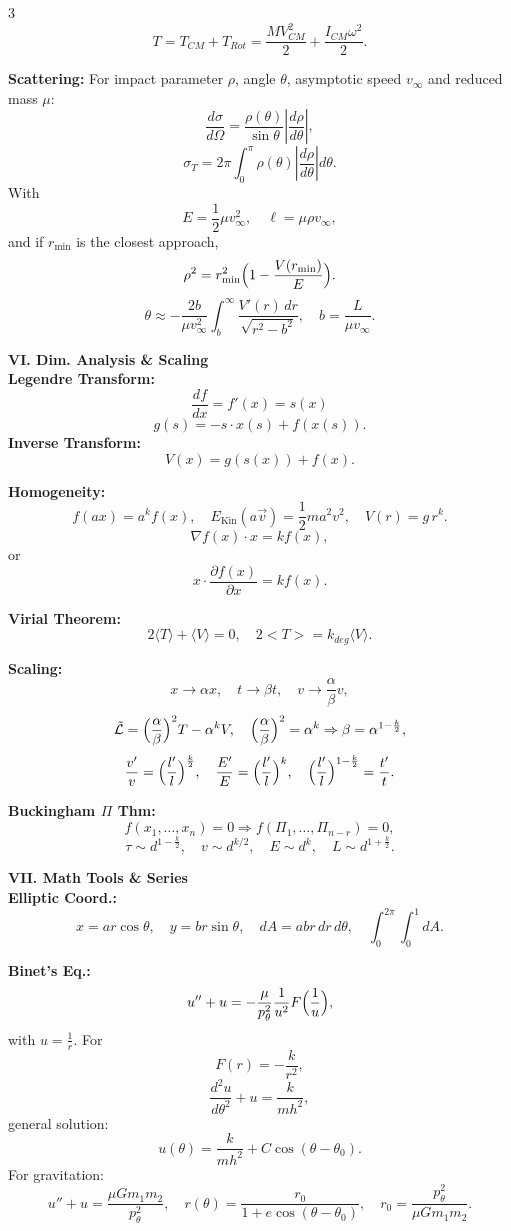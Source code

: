\documentclass[1pt]{article}
\begin{document}
\begin{multicols}{3}
\[
T=T_{CM}+T_{Rot}=\frac{MV_{CM}^2}{2}+\frac{I_{CM}\omega^2}{2}.
\]

\textbf{Scattering:} 
For impact parameter \(\rho\), angle \(\theta\), asymptotic speed \(v_\infty\) and reduced mass \(\mu\):
\[
\frac{d\sigma}{d\Omega}=\frac{\rho(\theta)}{\sin\theta}\left|\frac{d\rho}{d\theta}\right|,
\]
\[
\sigma_T=2\pi\int_0^\pi \rho(\theta)\left|\frac{d\rho}{d\theta}\right|d\theta.
\]
With 
\[
E=\frac{1}{2}\mu v_\infty^2,\quad \ell=\mu\rho v_\infty,
\]
and if \(r_{\min}\) is the closest approach,
\[
\rho^2=r_{\min}^2\Bigl(1-\frac{V(r_{\min})}{E}\Bigr).
\]
\[
\theta\approx -\frac{2b}{\mu v_\infty^2}\int_b^\infty\frac{V'(r)\,dr}{\sqrt{r^2-b^2}},\quad
b=\frac{L}{\mu v_\infty}.
\]

\textbf{VI. Dim. Analysis \& Scaling}\\[2pt]
\textbf{Legendre Transform:} 
\[
\frac{df}{dx}=f'(x)=s(x)
\]
\[
g(s)=-s\cdot x(s)+f(x(s)).
\]
\textbf{Inverse Transform:} 
\[
V(x)=g(s(x))+f(x).
\]

\textbf{Homogeneity:} 
\[
f(ax)=a^kf(x),\quad E_{\text{Kin}}(a\vec{v})=\frac{1}{2}ma^2v^2,
\quad V(r)=g\,r^k.
\]
\[
\nabla f(x)\cdot x=kf(x),
\]
or
\[
x\cdot\frac{\partial f(x)}{\partial x}=kf(x).
\]

\textbf{Virial Theorem:} 
\[
2\langle T\rangle+\langle V\rangle=0,\quad 2<T>=k_{deg}\langle V\rangle.
\]

\textbf{Scaling:} 
\[
x\to\alpha x,\quad t\to\beta t,\quad v\to\frac{\alpha}{\beta}v,
\]
\[
\tilde{\mathcal{L}}=\Bigl(\frac{\alpha}{\beta}\Bigr)^2T-\alpha^kV,\quad
\Bigl(\frac{\alpha}{\beta}\Bigr)^2=\alpha^k\Rightarrow\beta=\alpha^{1-\frac{k}{2}},
\]
\[
\frac{v'}{v}=\Bigl(\frac{l'}{l}\Bigr)^{\frac{k}{2}},\quad
\frac{E'}{E}=\Bigl(\frac{l'}{l}\Bigr)^k,\quad
\Bigl(\frac{l'}{l}\Bigr)^{1-\frac{k}{2}}=\frac{t'}{t}.
\]

\textbf{Buckingham \(\Pi\) Thm:} 
\[
f(x_1,\ldots,x_n)=0\Rightarrow f(\Pi_1,\ldots,\Pi_{n-r})=0,
\]
\[
\tau\sim d^{1-\frac{k}{2}},\quad
v\sim d^{k/2},\quad
E\sim d^k,\quad
L\sim d^{1+\frac{k}{2}}.
\]

\textbf{VII. Math Tools \& Series}\\[2pt]
\textbf{Elliptic Coord.:} 
\[
x=ar\cos\theta,\quad y=br\sin\theta,\quad dA=abr\,dr\,d\theta,\quad \int_0^{2\pi}\int_0^1dA.
\]

\textbf{Binet's Eq.:} 
\[
u''+u=-\frac{\mu}{p_\theta^2}\frac{1}{u^2}F\Bigl(\frac{1}{u}\Bigr),
\]
with \(u=\frac{1}{r}\). For 
\[
F(r)=-\frac{k}{r^2},
\]
\[
\frac{d^2u}{d\theta^2}+u=\frac{k}{mh^2},
\]
general solution:
\[
u(\theta)=\frac{k}{mh^2}+C\cos(\theta-\theta_0).
\]
For gravitation:
\[
u''+u=\frac{\mu Gm_1m_2}{p_\theta^2},\quad
r(\theta)=\frac{r_0}{1+e\cos(\theta-\theta_0)},\quad
r_0=\frac{p_\theta^2}{\mu Gm_1m_2}.
\]


\end{multicols}
\end{document}
